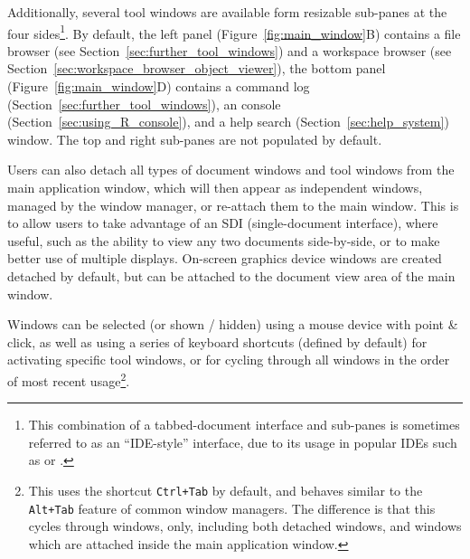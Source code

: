 Additionally, several tool windows are available form resizable sub-panes at the four sides\footnote{
    This combination of a tabbed-document interface and sub-panes is sometimes referred to as an ``IDE-style'' interface, due to its
    usage in popular IDEs such as  \citep{Eclipse} or  \citep{KDevelop}.
}. By default, the
left panel (Figure~\ref{fig:main_window}B) contains a file browser (see Section~\ref{sec:further_tool_windows}) and a
workspace browser (see Section~\ref{sec:workspace_browser_object_viewer}), the
bottom panel (Figure~\ref{fig:main_window}D) contains a command
log (Section~\ref{sec:further_tool_windows}), an  console
(Section~\ref{sec:using_R_console}), and a help search (Section~\ref{sec:help_system}) window. The top and right sub-panes are
not populated by default.

Users can also detach all types of document windows and tool windows from the main application window, which will
then appear as independent windows, managed by the window manager, or re-attach them to the main window.
This is to allow users to take advantage of an SDI (single-document interface), where useful, such as the ability to view any two
documents side-by-side, or to make better use of multiple displays. On{}-screen
graphics device windows are created detached by default, but can 
be attached to the document view area of the main window.

Windows can be selected (or shown / hidden) using a mouse device with point \&
click, as well as using a series of keyboard shortcuts (defined by
default) for activating specific tool windows, or for cycling through all windows
in the order of most recent usage\footnote{
    This uses the shortcut \texttt{Ctrl+Tab} by default, and behaves similar to the \texttt{Alt+Tab}
    feature of common window managers. The difference is that this cycles through  windows,
    only, including both detached windows, and windows which are attached inside the main application
    window.
}.

